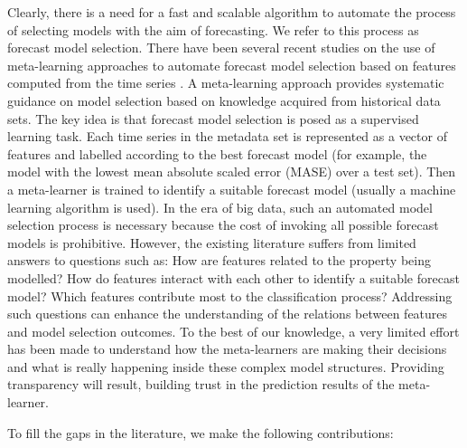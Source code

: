 \documentclass[11pt,a4paper,]{article}
\begin{document}
Clearly, there is a need for a fast and scalable algorithm to automate the process of selecting models with the aim of forecasting. We refer to this process as forecast model selection.
There have been several recent studies on the use of meta-learning approaches to automate forecast model selection based on features computed from the time series \autocites{shah1997model}{prudencio2004meta}{lemke2010meta}{kuck2016meta}. A meta-learning approach provides systematic guidance on model selection based on knowledge acquired from historical data sets. The key idea is that forecast model selection is posed as a supervised learning task. Each time series in the metadata set is represented as a vector of features and labelled according to the best forecast model (for example, the model with the lowest mean absolute scaled error (MASE) over a test set). Then a meta-learner is trained to identify a suitable forecast model (usually a machine learning algorithm is used). In the era of big data, such an automated model selection process is necessary because the cost of invoking all possible forecast models is prohibitive. However, the existing literature suffers from limited answers to questions such as: How are features related to the property being modelled? How do features interact with each other to identify a suitable forecast model? Which features contribute most to the classification process? Addressing such questions can enhance the understanding of the relations between features and model selection outcomes. To the best of our knowledge, a very limited effort has been made to understand how the meta-learners are making their decisions and what is really happening inside these complex model structures. Providing transparency will result, building trust in the prediction results of the meta-learner.

To fill the gaps in the literature, we make the following contributions:
\end{document}
